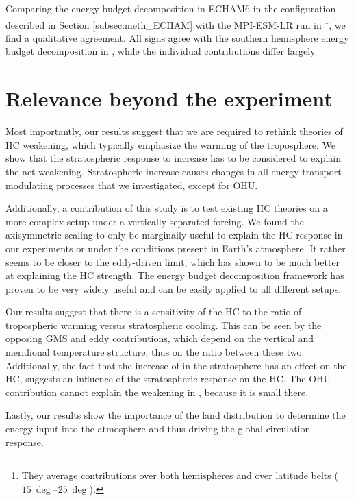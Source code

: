 
Comparing the energy budget decomposition in ECHAM6 in the configuration described in Section \ref{subsec:meth_ECHAM} with the MPI-ESM-LR run in \textcite{feldlCharacterizingHadleyCirculation2016}\footnote{They average contributions over both hemispheres and over latitude belts ($\SIrange{15}{25}{\deg}$).}, we find a qualitative agreement. All signs agree with the southern hemisphere energy budget decomposition in \uniform, while the individual contributions differ largely. 

\section{Relevance beyond the experiment}

Most importantly, our results suggest that we are required to rethink theories of HC weakening, which typically emphasize the warming of the troposphere. We show that the stratospheric response to \CO increase has to be considered to explain the net weakening. Stratospheric \CO increase causes changes in all energy transport modulating processes that we investigated, except for OHU.  

Additionally, a contribution of this study is to test existing HC theories on a more complex setup under a vertically separated \CO forcing. We found the axisymmetric scaling to only be marginally useful to explain the HC response in our experiments or under the conditions present in Earth's atmosphere. It rather seems to be closer to the eddy-driven limit, which has shown to be much better at explaining the HC strength. The energy budget decomposition framework has proven to be very widely useful and can be easily applied to all different setups.

Our results suggest that there is a sensitivity of the HC to the ratio of tropospheric warming versus stratospheric cooling. This can be seen by the opposing GMS and eddy contributions, which depend on the vertical and meridional temperature structure, thus on the ratio between these two. Additionally, the fact that the increase of \CO in the stratosphere has an effect on the HC, suggests an influence of the stratospheric response on the HC. The OHU contribution cannot explain the weakening in \strato, because it is small there.

Lastly, our results show the importance of the land distribution to determine the energy input into the atmosphere and thus driving the global circulation response. 


